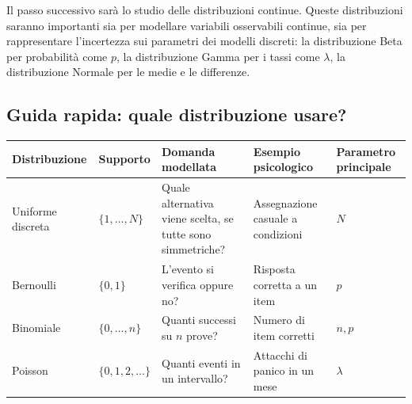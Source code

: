 \documentclass[
  italian,
  letterpaper,
  a4paper,
  11pt,
  open=any]{scrbook}
\newcounter{none} %
\theoremstyle{plain}
\theoremstyle{definition}
\theoremstyle{definition}
\theoremstyle{remark}
\begin{document}
Il passo successivo sarà lo studio delle distribuzioni continue. Queste
distribuzioni saranno importanti sia per modellare variabili osservabili
continue, sia per rappresentare l'incertezza sui parametri dei modelli
discreti: la distribuzione Beta per probabilità come \(p\), la
distribuzione Gamma per i tassi come \(\lambda\), la distribuzione
Normale per le medie e le differenze.

\subsection*{Guida rapida: quale distribuzione
usare?}\label{guida-rapida-quale-distribuzione-usare}

{\def\LTcaptype{none} %
\begin{longtable}[]{@{}
  >{\raggedright\arraybackslash}p{}
  >{\raggedright\arraybackslash}p{}
  >{\raggedright\arraybackslash}p{}
  >{\raggedright\arraybackslash}p{}
  >{\raggedright\arraybackslash}p{}@{}}
\toprule\noalign{}
\begin{minipage}[b]{\linewidth}\raggedright
Distribuzione
\end{minipage} & \begin{minipage}[b]{\linewidth}\raggedright
Supporto
\end{minipage} & \begin{minipage}[b]{\linewidth}\raggedright
Domanda modellata
\end{minipage} & \begin{minipage}[b]{\linewidth}\raggedright
Esempio psicologico
\end{minipage} & \begin{minipage}[b]{\linewidth}\raggedright
Parametro principale
\end{minipage} \\
\midrule\noalign{}
\endhead
\bottomrule\noalign{}
\endlastfoot
Uniforme discreta & \(\{1,\ldots,N\}\) & Quale alternativa viene scelta,
se tutte sono simmetriche? & Assegnazione casuale a condizioni &
\(N\) \\
Bernoulli & \(\{0,1\}\) & L'evento si verifica oppure no? & Risposta
corretta a un item & \(p\) \\
Binomiale & \(\{0,\ldots,n\}\) & Quanti successi su \(n\) prove? &
Numero di item corretti & \(n,p\) \\
Poisson & \(\{0,1,2,\ldots\}\) & Quanti eventi in un intervallo? &
Attacchi di panico in un mese & \(\lambda\) \\
\end{longtable}
}
\end{document}
